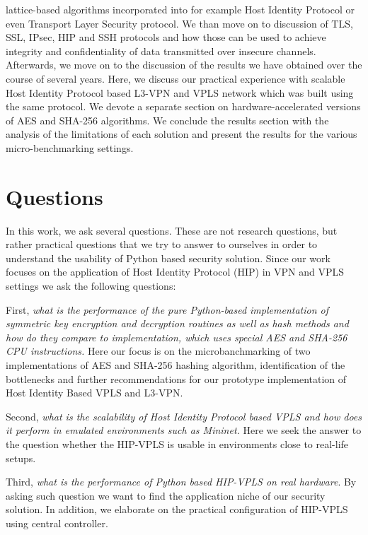 lattice-based algorithms incorporated into for example Host Identity Protocol 
or even Transport Layer Security protocol. We than move on to discussion of 
TLS, SSL, IPsec, HIP and SSH protocols and how those can be used to achieve 
integrity and confidentiality of data transmitted over insecure channels. 
Afterwards, we move on to the discussion of the results we have obtained 
over the course of several years. Here, we discuss our practical experience 
with scalable Host Identity Protocol based L3-VPN and VPLS network which was 
built using the same protocol. We devote a separate section on 
hardware-accelerated versions of AES and SHA-256 algorithms. We conclude 
the results section with the analysis of the limitations of each solution 
and present the results for the various micro-benchmarking settings.

\section{Questions}

In this work, we ask several questions. These are not research questions, 
but rather practical questions that we try to answer to ourselves in order to 
understand the usability of Python based security solution. Since our work 
focuses on the application of Host Identity Protocol (HIP) in VPN and VPLS 
settings we ask the following questions:

First, {\it what is the performance of the pure Python-based implementation of 
symmetric key encryption and decryption routines as well as hash methods and 
how do they compare to implementation, which uses special AES and SHA-256 CPU 
instructions.} Here our focus is on the microbanchmarking of two implementations 
of AES and SHA-256 hashing algorithm, identification of the bottlenecks and 
further recommendations for our prototype implementation of Host Identity Based VPLS and L3-VPN.

Second, {\it what is the scalability of Host Identity Protocol based VPLS and how does 
it perform in emulated environments such as Mininet.} Here we seek the answer to 
the question whether the HIP-VPLS is usable in environments close to real-life setups.

Third, {\it what is the performance of Python based HIP-VPLS on real hardware}. By 
asking such question we want to find the application niche of our security solution. In addition, 
we elaborate on the practical configuration of HIP-VPLS using central controller.

